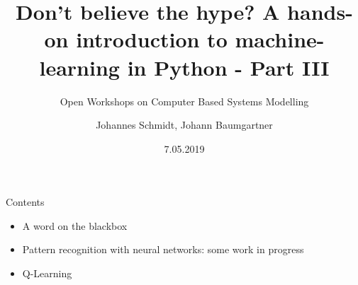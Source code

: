 \documentclass[color=usenames,dvipsnames]{beamer}
\title[Workshop - Machine Learning]{ Don't believe the hype? A hands-on introduction to machine-learning in Python - Part III}
\subtitle{Open Workshops on Computer Based Systems Modelling}
\author{Johannes Schmidt, Johann Baumgartner}
\institute{Institute for Sustainable Economic Development, BOKU, Vienna}
\date{7.05.2019}
\begin{document}
{


\begin{frame}

\maketitle



\end{frame}
}

\begin{frame}{Contents}
\begin{itemize}
	\item A word on the blackbox
	\item Pattern recognition with neural networks: some work in progress
	\item Q-Learning
\end{itemize}
\end{frame}

\end{document}
